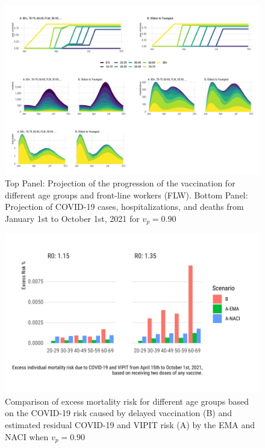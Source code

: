 \documentclass[]{elsarticle} %
\begin{document}
\begin{figure}[htb]
\begin{center}
\includegraphics[width=6in]{"../figures/vp0.90/fig-trajectoriesFull.pdf"}
\caption{Top Panel: Projection of the progression of the vaccination for different age groups and front-line workers (FLW). Bottom Panel: Projection of COVID-19 cases, hospitalizations, and deaths from January 1st to October 1st, 2021 for $v_p=0.90$}
\end{center}
\end{figure}

\begin{figure}[htb]
\begin{center}
\includegraphics[width=6in]{"../figures/vp0.90/fig3.pdf"}
\caption{Comparison of excess mortality risk for different age groups based on the COVID-19 risk caused by delayed vaccination (B) and estimated residual COVID-19 and VIPIT risk (A) by the EMA and NACI when $v_p=0.90$}
\end{center}
\end{figure}
\end{document}
